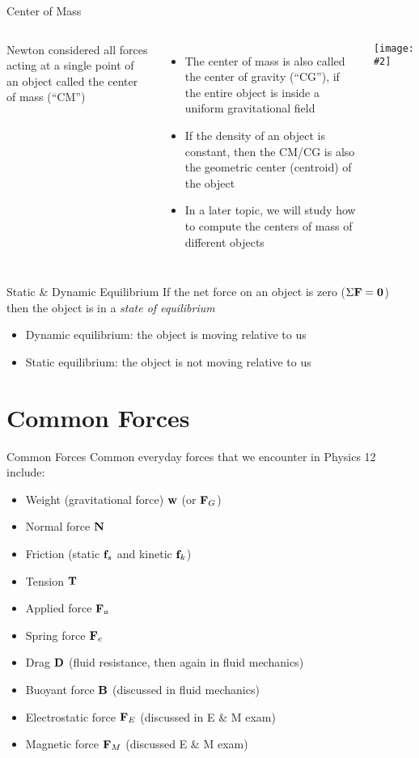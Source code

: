 \documentclass[12pt,compress,aspectratio=169]{beamer}
\newcommand{\pic}[2]{\texttt{[image: \#2]}}
\newcommand{\mb}[1]{\ensuremath\mathbf{#1}}
\begin{document}
\begin{frame}{Center of Mass}
  \vspace{.2in}
  \begin{columns}
    Newton considered all forces acting at a single point of an object called
    the center of mass (``CM'')
    \begin{itemize}
    \item The center of mass is also called the center of gravity (``CG''), if
      the entire object is inside a uniform gravitational field
    \item If the density of an object is constant, then the CM/CG is also the
      geometric center (centroid) of the object
    \item In a later topic, we will study how to compute the centers of mass of
      different objects
    \end{itemize}

    \pic{1}{graphics/cofm.png}
  \end{columns}
\end{frame}

\begin{frame}{Static \& Dynamic Equilibrium}
  If the net force on an object is zero ($\Sigma\mb{F}=\mb{0}$) then the
  object is in a \emph{state of equilibrium}
  \begin{itemize}
  \item Dynamic equilibrium: the object is moving relative to us
  \item Static equilibrium: the object is not moving relative to us
  \end{itemize}
\end{frame}


\section{Common Forces}

\begin{frame}{Common Forces}
  Common everyday forces that we encounter in Physics 12 include:
  \begin{itemize}
  \item Weight (gravitational force) $\mb{w}$ (or $\mb{F}_G$)
  \item Normal force $\mb{N}$
  \item Friction (static $\mb{f}_s$ and kinetic $\mb{f}_k$)
  \item Tension $\mb{T}$
  \item Applied force $\mb{F}_a$
  \item Spring force $\mb{F}_e$
  \item Drag $\mb{D}$ (fluid resistance, then again in fluid mechanics)
  \item Buoyant force $\mb{B}$ (discussed in fluid mechanics)
  \item Electrostatic force $\mb{F}_E$ (discussed in E \& M exam)
  \item Magnetic force $\mb{F}_M$ (discussed E \& M exam)
  \end{itemize}
\end{frame}
\end{document}
